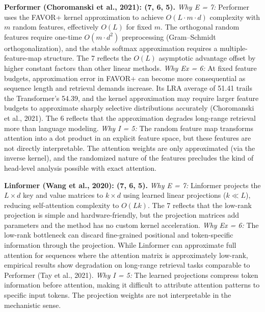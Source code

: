 \documentclass[10pt,twocolumn]{article}
\begin{document}
\textbf{Performer (Choromanski et al., 2021): (7, 6, 5).}
\textit{Why E = 7:} Performer uses the FAVOR+ kernel approximation to achieve $O(L \cdot m \cdot d)$ complexity with $m$ random features, effectively $O(L)$ for fixed $m$. The orthogonal random features require one-time $O(m \cdot d^2)$ preprocessing (Gram--Schmidt orthogonalization), and the stable softmax approximation requires a multiple-feature-map structure. The 7 reflects the $O(L)$ asymptotic advantage offset by higher constant factors than other linear methods. \textit{Why Ex = 6:} At fixed feature budgets, approximation error in FAVOR+ can become more consequential as sequence length and retrieval demands increase. Its LRA average of 51.41 trails the Transformer's 54.39, and the kernel approximation may require larger feature budgets to approximate sharply selective distributions accurately (Choromanski et al., 2021). The 6 reflects that the approximation degrades long-range retrieval more than language modeling. \textit{Why I = 5:} The random feature map transforms attention into a dot product in an explicit feature space, but these features are not directly interpretable. The attention weights are only approximated (via the inverse kernel), and the randomized nature of the features precludes the kind of head-level analysis possible with exact attention.

\textbf{Linformer (Wang et al., 2020): (7, 6, 5).}
\textit{Why E = 7:} Linformer projects the $L \times d$ key and value matrices to $k \times d$ using learned linear projections ($k \ll L$), reducing self-attention complexity to $O(Lk)$. The 7 reflects that the low-rank projection is simple and hardware-friendly, but the projection matrices add parameters and the method has no custom kernel acceleration. \textit{Why Ex = 6:} The low-rank bottleneck can discard fine-grained positional and token-specific information through the projection. While Linformer can approximate full attention for sequences where the attention matrix is approximately low-rank, empirical results show degradation on long-range retrieval tasks comparable to Performer (Tay et al., 2021). \textit{Why I = 5:} The learned projections compress token information before attention, making it difficult to attribute attention patterns to specific input tokens. The projection weights are not interpretable in the mechanistic sense.
\end{document}
